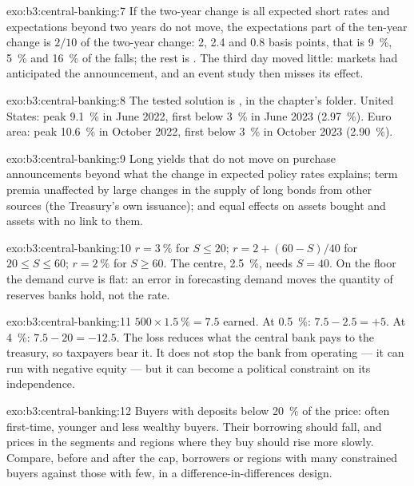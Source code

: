 \begin{solution}{exo:b3:central-banking:7}
If the two-year change is all expected short rates and expectations beyond two
years do not move, the expectations part of the ten-year change is $2/10$ of the
two-year change: 2, 2.4 and 0.8 basis points, that is 9~\%, 5~\% and 16~\% of the falls;
the rest is . The third day moved little: markets had anticipated
the announcement, and an event study then misses its effect.
\end{solution}

\begin{solution}{exo:b3:central-banking:8}
The tested solution is , in the chapter's
 folder. United States: peak 9.1~\% in June 2022, first below 3~\% in June
2023 (2.97~\%). Euro area: peak 10.6~\% in October 2022, first below 3~\% in October 2023
(2.90~\%). %
\end{solution}

\begin{solution}{exo:b3:central-banking:9}
Long yields that do not move on purchase announcements beyond what the change in
expected policy rates explains; term premia unaffected by large changes in the
supply of long bonds from other sources (the Treasury's own issuance); and equal
effects on assets bought and assets with no link to them.
\end{solution}

\begin{solution}{exo:b3:central-banking:10}
$r = 3~\%$ for $S \le 20$; $r = 2 + (60 - S)/40$ for $20 \le S \le 60$; $r = 2~\%$ for $S \ge 60$. The centre, 2.5~\%,
needs $S = 40$. On the floor the demand curve is flat: an error in forecasting
demand moves the quantity of reserves banks hold, not the rate.
\end{solution}

\begin{solution}{exo:b3:central-banking:11}
$500 \times 1.5~\% = 7.5$ earned. At 0.5~\%: $7.5 - 2.5 = +5$. At 4~\%: $7.5 - 20 = -12.5$. The loss
reduces what the central bank pays to the treasury, so taxpayers bear it. It
does not stop the bank from operating --- it can run with negative equity --- but
it can become a political constraint on its independence.
\end{solution}

\begin{solution}{exo:b3:central-banking:12}
Buyers with deposits below 20~\% of the price: often first-time, younger and less
wealthy buyers. Their borrowing should fall, and prices in the segments and regions
where they buy should rise more slowly. Compare, before and after the cap,
borrowers or regions with many constrained buyers against those with few, in a
difference-in-differences design.
\end{solution}

